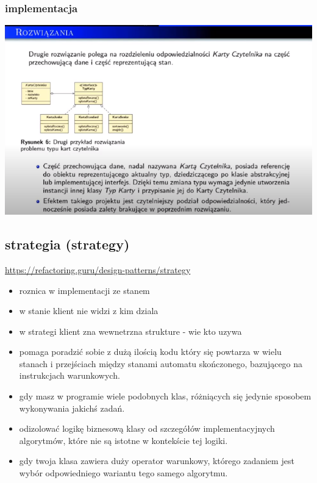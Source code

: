 \documentclass[11pt]{article}
\begin{document}
\subsubsection{implementacja}
\label{sec:orgad45b20}
\begin{center}
\includegraphics[width=.9\linewidth]{./stan.png}
\end{center}
\subsection{strategia (strategy)}
\label{sec:org589c594}
\url{https://refactoring.guru/design-patterns/strategy}
\begin{itemize}
\item roznica w implementacji ze stanem
\item w stanie klient nie widzi z kim dziala
\item w strategi klient zna wewnetrzna strukture - wie kto uzywa
\item pomaga poradzić sobie z dużą ilością kodu który się powtarza w wielu stanach i przejściach między stanami automatu skończonego, bazującego na instrukcjach warunkowych.
\item gdy masz w programie wiele podobnych klas, różniących się jedynie sposobem wykonywania jakichś zadań.
\item odizolować logikę biznesową klasy od szczegółów implementacyjnych algorytmów, które nie są istotne w kontekście tej logiki.
\item gdy twoja klasa zawiera duży operator warunkowy, którego zadaniem jest wybór odpowiedniego wariantu tego samego algorytmu.
\end{itemize}
\end{document}

